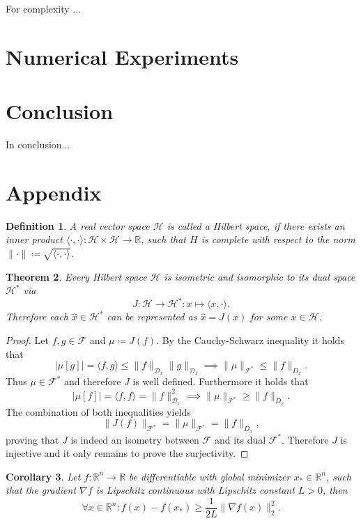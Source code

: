 \documentclass[11pt, a4paper]{article}
\newtheorem{theorem}{Theorem}[section]
\newtheorem{corollary}[theorem]{Corollary}
\newtheorem{definition}[theorem]{Definition}
\newcommand{\R}{\mathbb{R}}
\newcommand{\D}{\mathcal{D}}
\newcommand{\F}{\mathcal{F}}
\renewcommand{\H}{\mathcal{H}}
\begin{document}
For complexity ...

\pagebreak
\section{Numerical Experiments}

\pagebreak
\section{Conclusion}

In conclusion...

\pagebreak
\section{Appendix}

\begin{definition}
A real vector space $\H$ is called a Hilbert space, if there exists an inner product $\langle \cdot,\cdot \rangle : \H \times \H \to \R$, such that $H$ is complete with respect to the norm $\| \cdot \| \coloneq \sqrt{\langle \cdot,\cdot \rangle}$.
\end{definition}

\begin{theorem}
Every Hilbert space $\H$ is isometric and isomorphic to its dual space $\H^*$ via
\[ J: \H \to \H^* : x \mapsto \langle x, \cdot \rangle. \]
Therefore each $\hat{x} \in \H^*$ can be represented as $\hat{x} = J(x)$ for some $x \in \H$.
\end{theorem}

\begin{proof}
Let $f, g \in \F$ and $\mu \coloneq J(f)$. By the Cauchy-Schwarz inequality it holds that
\[ \big | \mu[g] \big | = \langle f,g \rangle \leq \big \| f \big \|_{\D_x} \big \| g \big \|_{\D_x} \implies \big \| \mu \big \|_{\F^*} \le \big \| f \big \|_{D_x}. \]
Thus $\mu \in \F^*$ and therefore $J$ is well defined. Furthermore it holds that 
\[ \big | \mu[f] \big | = \langle f,f \rangle = \big \| f \big \|_{\D_x}^2 \implies \big \| \mu \big \|_{\F^*} \ge \big \| f \big \|_{D_x}. \]
The combination of both inequalities yields
\[ \big \| J(f) \big \|_{\F^*} = \big \| \mu \big \|_{\F^*} = \big \| f \big \|_{D_x}, \]
proving that $J$ is indeed an isometry between $\F$ and its dual $\F^*$. Therefore $J$ is injective and it only remains to prove the surjectivity.
\end{proof}

\begin{corollary} \label{cor:descent}
Let $f: \R^n \to \R$ be differentiable with global minimizer $x_* \in \R^n$, such that the gradient $\nabla f$ is Lipschitz continuous with Lipschitz constant $L >0$, then
\[ \forall x \in \R^n : f(x) - f(x_*) \geq \frac{1}{2L} \big \| \nabla f(x) \big \|_2^2. \]
\end{corollary}
\end{document}
